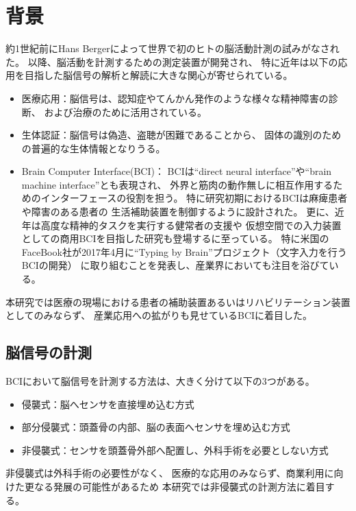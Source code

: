 \section{\mc 背景}
約1世紀前にHans Bergerによって世界で初のヒトの脳活動計測の試みがなされた\cite{宮内1,宮内2,宮内3}。
以降、脳活動を計測するための測定装置が開発され、
特に近年は以下の応用を目指した脳信号の解析と解読に大きな関心が寄せられている。
\begin{itemize}
    \item 医療応用：脳信号は、認知症やてんかん発作のような様々な精神障害の診断、
    および治療のために活用されている\cite{精神疾患,認知症}。
    \item 生体認証：脳信号は偽造、盗聴が困難であることから、
    固体の識別のための普遍的な生体情報となりうる\cite{個人認証,ウェアラブル個人認証}。
    \item Brain Computer Interface(BCI)：
    BCIは``direct neural interface''や``brain machine interface''とも表現され、
    外界と筋肉の動作無しに相互作用するためのインターフェースの役割を担う\cite{DNI}。
    特に研究初期におけるBCIは麻痺患者や障害のある患者の
    生活補助装置を制御するように設計された\cite{BCIbasic}。
    更に、近年は高度な精神的タスクを実行する健常者の支援や
    仮想空間での入力装置としての商用BCIを目指した研究も登場するに至っている\cite{VRBCI,VRBCIsv}。
    特に米国のFaceBook社が2017年4月に``Typing by Brain''プロジェクト（文字入力を行うBCIの開発）
    に取り組むことを発表し、産業界においても注目を浴びている。
\end{itemize}
本研究では医療の現場における患者の補助装置あるいはリハビリテーション装置としてのみならず、
産業応用への拡がりも見せているBCIに着目した。

\subsection{\mc 脳信号の計測}
BCIにおいて脳信号を計測する方法は、大きく分けて以下の3つがある\cite{BCImeasure}。
\begin{itemize}
    \item 侵襲式：脳へセンサを直接埋め込む方式
    \item 部分侵襲式：頭蓋骨の内部、脳の表面へセンサを埋め込む方式
    \item 非侵襲式：センサを頭蓋骨外部へ配置し、外科手術を必要としない方式
\end{itemize}
非侵襲式は外科手術の必要性がなく、
医療的な応用のみならず、商業利用に向けた更なる発展の可能性があるため
本研究では非侵襲式の計測方法に着目する。

